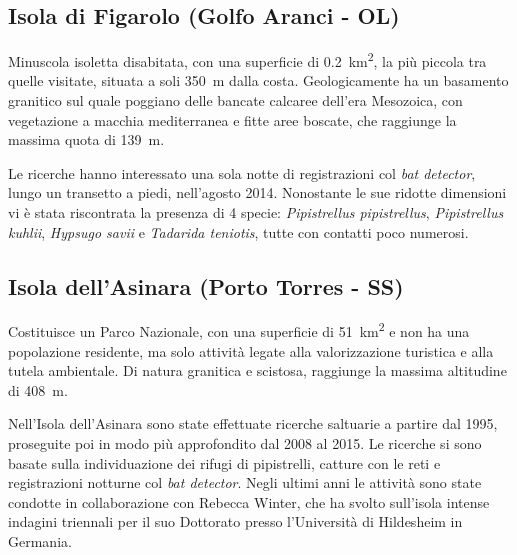 \begin{multicols}{2}
\begin{compactdesc}
\subsection*{Isola di Figarolo (Golfo Aranci - OL)}
Minuscola isoletta disabitata, con una superficie di \SI{0.2}{\square\kilo\meter}, la più piccola tra quelle visitate, situata a soli 350~m dalla costa. Geologicamente ha un basamento granitico sul quale poggiano delle bancate calcaree dell’era Mesozoica, con vegetazione a macchia mediterranea e fitte aree boscate, che raggiunge la massima quota di 139~m.
  
Le ricerche hanno interessato una sola notte di registrazioni col \textit{bat detector}, lungo un transetto a piedi, nell’agosto 2014.
Nonostante le sue ridotte dimensioni vi è stata riscontrata la presenza di 4 specie: \emph{Pipistrellus pipistrellus}, \emph{Pipistrellus kuhlii}, \emph{Hypsugo savii} e \emph{Tadarida teniotis}, tutte con contatti poco numerosi.

\subsection*{Isola dell'Asinara (Porto Torres - SS)}
Costituisce un Parco Nazionale, con una superficie di \SI{51}{\square\kilo\meter} e non ha una popolazione residente, ma solo attività legate alla valorizzazione turistica e alla tutela ambientale. Di natura granitica e scistosa, raggiunge la massima altitudine di 408~m.

Nell’Isola dell’Asinara sono state effettuate ricerche saltuarie a partire dal 1995, proseguite poi in modo più approfondito dal 2008 al 2015.
Le ricerche si sono basate sulla individuazione dei rifugi di pipistrelli, catture con le reti e registrazioni notturne col \textit{bat detector}. Negli ultimi anni le attività sono state condotte in collaborazione con Rebecca Winter, che ha svolto sull’isola intense indagini triennali per il suo Dottorato presso l’Università di Hildesheim in Germania. 


\end{compactdesc}
\end{multicols}
